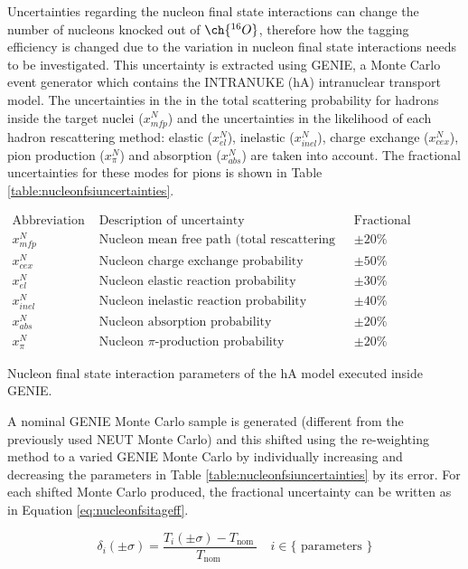 Uncertainties regarding the nucleon final state interactions can change the number of nucleons knocked out of $\ch{^{16}O}$, therefore how the tagging efficiency is changed due to the variation in nucleon final state interactions needs to be investigated. This uncertainty is extracted using GENIE, a Monte Carlo event generator which contains the INTRANUKE (hA) intranuclear transport model. The uncertainties in the in the total scattering probability for hadrons inside the target nuclei ($x_{m f p}^{N}$) and the uncertainties in the likelihood of each hadron rescattering method: elastic ($x_{e l}^{N}$), inelastic ($x_{i n e l}^{N}$), charge exchange ($x_{c e x}^{N}$), pion production ($x_{\pi}^{N}$) and absorption ($x_{a b s}^{N}$) are taken into account. The fractional uncertainties for these modes for pions is shown in Table \ref{table:nucleonfsiuncertainties}. 

\begin{table}
$$
\begin{array}{llc}
\text {Abbreviation} & \text { Description of uncertainty }  & \text{Fractional uncertainty} \\
 x_{m f p}^{N} & \text { Nucleon mean free path (total rescattering probability) } & \pm 20 \% \\
x_{c e x}^{N} & \text { Nucleon charge exchange probability } & \pm 50 \% \\
x_{e l}^{N} & \text { Nucleon elastic reaction probability } & \pm 30 \% \\
x_{i n e l}^{N} & \text { Nucleon inelastic reaction probability } & \pm 40 \% \\
x_{a b s}^{N} & \text { Nucleon absorption probability } & \pm 20 \% \\
x_{\pi}^{N} & \text { Nucleon } \pi \text {-production probability } & \pm 20 \%
\end{array}
$$
\caption{Nucleon final state interaction parameters of the hA model executed inside GENIE.} 
\label{table:nucleonfsiuncertainties}
\end{table}

A nominal GENIE Monte Carlo sample is generated (different from the previously used NEUT Monte Carlo) and this shifted using the re-weighting method to a varied GENIE Monte Carlo by individually increasing and decreasing the parameters in Table \ref{table:nucleonfsiuncertainties} by its error. For each shifted Monte Carlo produced, the fractional uncertainty can be written as in Equation \ref{eq:nucleonfsitageff}.

\begin{equation}
\delta_{i}(\pm \sigma)=\frac{T_{i}(\pm \sigma)-T_{\text {nom }}}{T_{\text {nom }}} \quad i \in\{\text { parameters }\}
\label{eq:nucleonfsitageff}
\end{equation}

